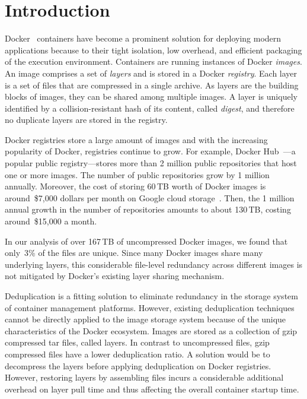 \section{Introduction}
 
Docker~\cite{docker} containers have become a prominent solution for deploying modern applications because to their tight isolation, low overhead, and efficient packaging of the execution environment.
Containers are running instances of Docker \emph{images}. An image comprises a set of \emph{layers} and is stored in a Docker \emph{registry}. Each layer is a set of files that are compressed in a single archive. As layers are the building blocks of images, they can be shared among multiple images. A layer is uniquely identified by a collision-resistant hash of its content, called \emph{digest}, and therefore no duplicate layers are stored in the registry.

Docker registries store a large amount of images and with the increasing popularity of Docker, registries continue to grow. 
For example, Docker Hub~\cite{docker-hub}---a popular public registry---stores more than 2 million public repositories that host one or more images. 
The number of public repositories grow by 1 million annually. 
Moreover, the cost of storing 60\,TB worth of Docker images is around~\$7,000 dollars per month on Google cloud storage~\cite{GoogleCloudStoragePricing}.
Then, the 1 million annual growth in the number of repositories amounts to about 130\,TB, costing around~\$15,000 a month.

In our analysis of over 167\,TB of uncompressed Docker images, we found that only~3\% of the files are unique. Since many Docker images share many underlying layers, this considerable file-level redundancy across different images is not mitigated by Docker's existing layer sharing mechanism.

Deduplication is a fitting solution to eliminate redundancy in the storage system of container management platforms. 
However, existing deduplication techniques cannot be directly applied to the image storage system 
because of the unique characteristics of the Docker ecosystem. Images are stored as a collection of gzip compressed tar files, called layers. 
In contrast to uncompressed files, gzip compressed files have a lower deduplication ratio. 
A solution would be to decompress the layers before applying deduplication on Docker registries.
However, restoring layers by assembling files incurs a considerable additional overhead on layer pull time and thus affecting the overall container startup time.  

